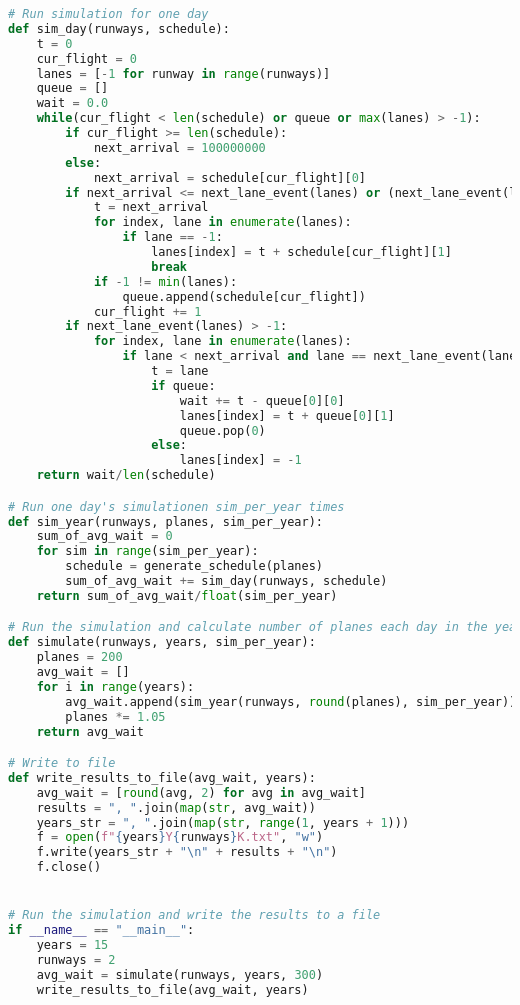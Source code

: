 \begin{lstlisting}[language=Python, caption={airplanes.py}]
# Run simulation for one day
def sim_day(runways, schedule):
    t = 0
    cur_flight = 0
    lanes = [-1 for runway in range(runways)]
    queue = []
    wait = 0.0
    while(cur_flight < len(schedule) or queue or max(lanes) > -1):
        if cur_flight >= len(schedule):
            next_arrival = 100000000
        else:
            next_arrival = schedule[cur_flight][0]
        if next_arrival <= next_lane_event(lanes) or (next_lane_event(lanes) == -1 and cur_flight < len(schedule)):
            t = next_arrival
            for index, lane in enumerate(lanes):
                if lane == -1:
                    lanes[index] = t + schedule[cur_flight][1]
                    break
            if -1 != min(lanes):
                queue.append(schedule[cur_flight])
            cur_flight += 1
        if next_lane_event(lanes) > -1:
            for index, lane in enumerate(lanes):
                if lane < next_arrival and lane == next_lane_event(lanes):
                    t = lane
                    if queue:
                        wait += t - queue[0][0]
                        lanes[index] = t + queue[0][1]
                        queue.pop(0)
                    else:
                        lanes[index] = -1
    return wait/len(schedule)

# Run one day's simulationen sim_per_year times
def sim_year(runways, planes, sim_per_year):
    sum_of_avg_wait = 0
    for sim in range(sim_per_year):
        schedule = generate_schedule(planes)
        sum_of_avg_wait += sim_day(runways, schedule)
    return sum_of_avg_wait/float(sim_per_year)

# Run the simulation and calculate number of planes each day in the year
def simulate(runways, years, sim_per_year):
    planes = 200
    avg_wait = []
    for i in range(years):
        avg_wait.append(sim_year(runways, round(planes), sim_per_year))
        planes *= 1.05
    return avg_wait

# Write to file
def write_results_to_file(avg_wait, years):
    avg_wait = [round(avg, 2) for avg in avg_wait]
    results = ", ".join(map(str, avg_wait))
    years_str = ", ".join(map(str, range(1, years + 1)))
    f = open(f"{years}Y{runways}K.txt", "w")
    f.write(years_str + "\n" + results + "\n")
    f.close()


# Run the simulation and write the results to a file
if __name__ == "__main__":
    years = 15
    runways = 2
    avg_wait = simulate(runways, years, 300)
    write_results_to_file(avg_wait, years)
\end{lstlisting}

